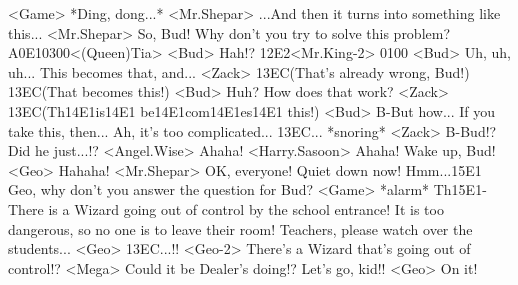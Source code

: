 <Game> *Ding, dong...* 
<Mr.Shepar> ...And then it turns into something like this... 
<Mr.Shepar> So, Bud! 
Why don't you try to solve this problem? 
{A0}{E1}{03}{00}<(Queen)Tia> 
<Bud> Hah!? 
{12}{E2}<Mr.King-2> {01}{00} 
<Bud> Uh, uh, uh... This becomes that, and... 
<Zack> {13}{EC}(That's already wrong, Bud!) 
{13}{EC}(That becomes this!) 
<Bud> Huh? 
How does that work? 
<Zack> {13}{EC}(Th{14}{E1}is{14}{E1} be{14}{E1}com{14}{E1}es{14}{E1} this!) 
<Bud> B-But how... 
If you take this, then... Ah, it's too complicated... 
{13}{EC}... 
*snoring* 
<Zack> B-Bud!? Did he just...!? 
<Angel.Wise> Ahaha! 
<Harry.Sasoon> Ahaha! Wake up, Bud! 
<Geo> Hahaha! 
<Mr.Shepar> OK, everyone! Quiet down now! 
Hmm...{15}{E1} Geo, why don't you answer the question for Bud? 
<Game> *alarm* 
Th{15}{E1}-There is a Wizard going out of control by the school entrance! 
It is too dangerous, so no one is to leave their room! 
Teachers, please watch over the students... 
<Geo> {13}{EC}...!! 
<Geo-2> There's a Wizard that's going out of control!? 
<Mega> Could it be Dealer's doing!? 
Let's go, kid!! 
<Geo> On it! 

